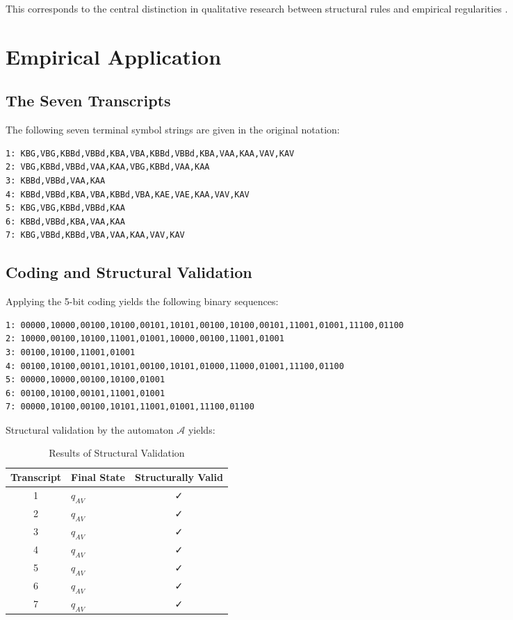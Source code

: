 \documentclass[
  12pt,
  a4paper,
  oneside,
  titlepage
]{article}
\begin{document}
This corresponds to the central distinction in qualitative research between 
structural rules and empirical regularities \citep[ p.~34]{Przyborski2021}.

\section{Empirical Application}

\subsection{The Seven Transcripts}

The following seven terminal symbol strings are given in the original notation:

\begin{verbatim}
1: KBG,VBG,KBBd,VBBd,KBA,VBA,KBBd,VBBd,KBA,VAA,KAA,VAV,KAV
2: VBG,KBBd,VBBd,VAA,KAA,VBG,KBBd,VAA,KAA
3: KBBd,VBBd,VAA,KAA
4: KBBd,VBBd,KBA,VBA,KBBd,VBA,KAE,VAE,KAA,VAV,KAV
5: KBG,VBG,KBBd,VBBd,KAA
6: KBBd,VBBd,KBA,VAA,KAA
7: KBG,VBBd,KBBd,VBA,VAA,KAA,VAV,KAV
\end{verbatim}

\subsection{Coding and Structural Validation}

Applying the 5-bit coding yields the following binary sequences:

\begin{lstlisting}[caption=Coded Terminal Symbol Strings]
1: 00000,10000,00100,10100,00101,10101,00100,10100,00101,11001,01001,11100,01100
2: 10000,00100,10100,11001,01001,10000,00100,11001,01001
3: 00100,10100,11001,01001
4: 00100,10100,00101,10101,00100,10101,01000,11000,01001,11100,01100
5: 00000,10000,00100,10100,01001
6: 00100,10100,00101,11001,01001
7: 00000,10100,00100,10101,11001,01001,11100,01100
\end{lstlisting}

Structural validation by the automaton \(\mathcal{A}\) yields:

\begin{table}[h]
\centering
\caption{Results of Structural Validation}
\label{tab:validation}
\begin{tabular}{@{} c l c @{}}
\toprule
\textbf{Transcript} & \textbf{Final State} & \textbf{Structurally Valid} \\
\midrule
1 & \(q_{AV}\) & ✓ \\
2 & \(q_{AV}\) & ✓ \\
3 & \(q_{AV}\) & ✓ \\
4 & \(q_{AV}\) & ✓ \\
5 & \(q_{AV}\) & ✓ \\
6 & \(q_{AV}\) & ✓ \\
7 & \(q_{AV}\) & ✓ \\
\bottomrule
\end{tabular}
\end{table}
\end{document}
